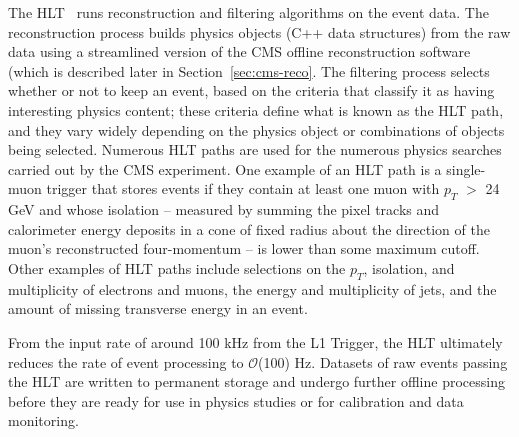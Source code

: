 The HLT~\cite{Cittolin:578006} runs reconstruction and filtering algorithms on the event data. The reconstruction process builds physics objects (C++ data structures) from the raw data using a streamlined version of the CMS offline reconstruction software (which is described later in Section~\ref{sec:cms-reco}. The filtering process selects whether or not to keep an event, based on the criteria that classify it as having interesting physics content; these criteria define what is known as the HLT path, and they vary widely depending on the physics object or combinations of objects being selected. Numerous HLT paths are used for the numerous physics searches carried out by the CMS experiment. One example of an HLT path is a single-muon trigger that stores events if they contain at least one muon with $p_T$ $>$ 24 GeV and whose isolation -- measured by summing the pixel tracks and calorimeter energy deposits in a cone of fixed radius about the direction of the muon's reconstructed four-momentum -- is lower than some maximum cutoff. Other examples of HLT paths include selections on the $p_T$, isolation, and multiplicity of electrons and muons, the energy and multiplicity of jets, and the amount of missing transverse energy in an event.

From the input rate of around 100 kHz from the L1 Trigger, the HLT ultimately reduces the rate of event processing to $\mathcal{O}$(100) Hz. Datasets of raw events passing the HLT are written to permanent storage and undergo further offline processing before they are ready for use in physics studies or for calibration and data monitoring.
